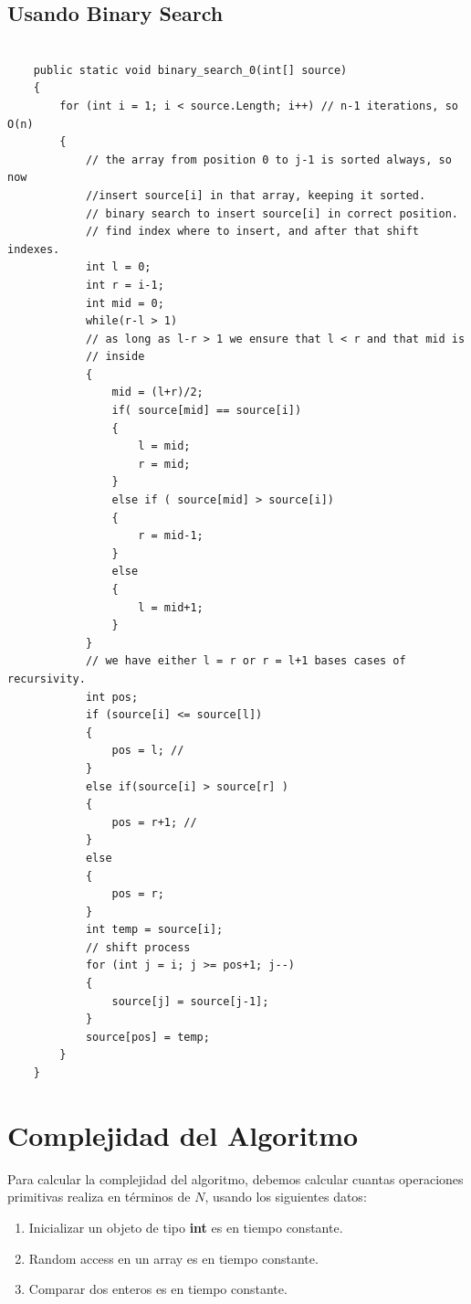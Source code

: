\documentclass[14pt]{extarticle}
\begin{document}
\subsection{Usando Binary Search}
\begin{verbatim}

    public static void binary_search_0(int[] source)
    {
        for (int i = 1; i < source.Length; i++) // n-1 iterations, so O(n)
        {
            // the array from position 0 to j-1 is sorted always, so now 
            //insert source[i] in that array, keeping it sorted.
            // binary search to insert source[i] in correct position.
            // find index where to insert, and after that shift indexes.
            int l = 0;
            int r = i-1;
            int mid = 0;
            while(r-l > 1)
            // as long as l-r > 1 we ensure that l < r and that mid is
            // inside
            {
                mid = (l+r)/2;
                if( source[mid] == source[i])
                {
                    l = mid;
                    r = mid;
                }
                else if ( source[mid] > source[i])
                {
                    r = mid-1;
                }
                else
                {
                    l = mid+1;
                }
            }
            // we have either l = r or r = l+1 bases cases of recursivity.
            int pos;
            if (source[i] <= source[l])
            {
                pos = l; //
            }
            else if(source[i] > source[r] )
            {
                pos = r+1; // 
            }
            else
            {
                pos = r;
            }
            int temp = source[i];
            // shift process
            for (int j = i; j >= pos+1; j--)
            {
                source[j] = source[j-1];
            }
            source[pos] = temp;
        }        
    }    

\end{verbatim}

\section{Complejidad del Algoritmo}

Para calcular la complejidad del algoritmo, debemos calcular cuantas operaciones primitivas realiza en términos de $N$, usando los siguientes datos:

\begin{enumerate}
    \item Inicializar un objeto de tipo \textbf{int} es en tiempo constante.
    \item Random access en un array es en tiempo constante.
    \item Comparar dos enteros es en tiempo constante.
\end{enumerate}
 
\end{document}
